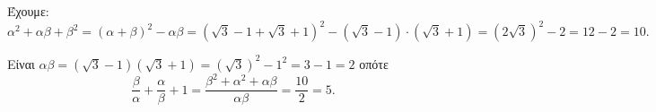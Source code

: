 
\begin{alist}
\item Έχουμε:
\[\alpha^2 + \alpha\beta + \beta^2 = (\alpha + \beta)^2 - \alpha\beta = (\sqrt{3} - 1 + \sqrt{3} + 1)^2 - (\sqrt{3} - 1) \cdot (\sqrt{3} + 1) = (2\sqrt{3})^2 - 2 = 12 - 2 = 10.\]

\item Είναι $\alpha\beta = (\sqrt{3} - 1)(\sqrt{3} + 1) = (\sqrt{3})^2 - 1^2 = 3 - 1 = 2$ οπότε
\[\dfrac{\beta}{\alpha} + \dfrac{\alpha}{\beta} + 1 = \dfrac{\beta^2 + \alpha^2 + \alpha\beta}{\alpha\beta} = \dfrac{10}{2} = 5.\]
\end{alist}

